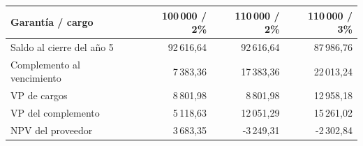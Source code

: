 \begin{tabular}{@{}lrrr@{}}
\toprule
Garantía / cargo & 100\,000 / 2\% & 110\,000 / 2\% & 110\,000 / 3\% \\
\midrule
Saldo al cierre del año 5 & 92\,616,64 & 92\,616,64 & 87\,986,76 \\
Complemento al vencimiento & 7\,383,36 & 17\,383,36 & 22\,013,24 \\
VP de cargos & 8\,801,98 & 8\,801,98 & 12\,958,18 \\
VP del complemento & 5\,118,63 & 12\,051,29 & 15\,261,02 \\
NPV del proveedor & 3\,683,35 & -3\,249,31 & -2\,302,84 \\
\bottomrule
\end{tabular}
